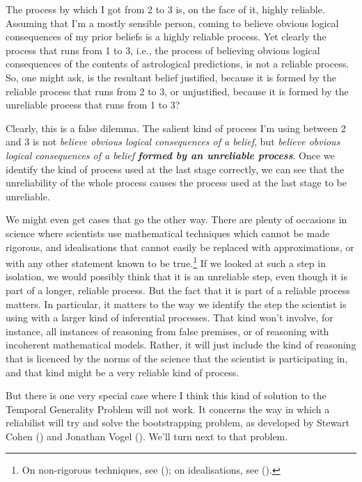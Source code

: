 \documentclass[
  10pt,
  letterpaper,
  DIV=11,
  numbers=noendperiod,
  twoside]{scrartcl}
\begin{document}
The process by which I got from 2 to 3 is, on the face of it, highly
reliable. Assuming that I'm a mostly sensible person, coming to believe
obvious logical consequences of my prior beliefs is a highly reliable
process. Yet clearly the process that runs from 1 to 3, i.e., the
process of believing obvious logical consequences of the contents of
astrological predictions, is not a reliable process. So, one might ask,
is the resultant belief justified, because it is formed by the reliable
process that runs from 2 to 3, or unjustified, because it is formed by
the unreliable process that runs from 1 to 3?

Clearly, this is a false dilemma. The salient kind of process I'm using
between 2 and 3 is not \emph{believe obvious logical consequences of a
belief}, but \emph{believe obvious logical consequences of a belief
\textbf{formed by an unreliable process}}. Once we identify the kind of
process used at the last stage correctly, we can see that the
unreliability of the whole process causes the process used at the last
stage to be unreliable.

We might even get cases that go the other way. There are plenty of
occasions in science where scientists use mathematical techniques which
cannot be made rigorous, and idealisations that cannot easily be
replaced with approximations, or with any other statement known to be
true.\footnote{On non-rigorous techniques, see
  (); on idealisations, see
  ().} If we looked at such a step
in isolation, we would possibly think that it is an unreliable step,
even though it is part of a longer, reliable process. But the fact that
it is part of a reliable process matters. In particular, it matters to
the way we identify the step the scientist is using with a larger kind
of inferential processes. That kind won't involve, for instance, all
instances of reasoning from false premises, or of reasoning with
incoherent mathematical models. Rather, it will just include the kind of
reasoning that is licenced by the norms of the science that the
scientist is participating in, and that kind might be a very reliable
kind of process.

But there is one very special case where I think this kind of solution
to the Temporal Generality Problem will not work. It concerns the way in
which a reliabilist will try and solve the bootstrapping problem, as
developed by Stewart Cohen () and Jonathan
Vogel (). We'll turn next to that problem.
\end{document}
